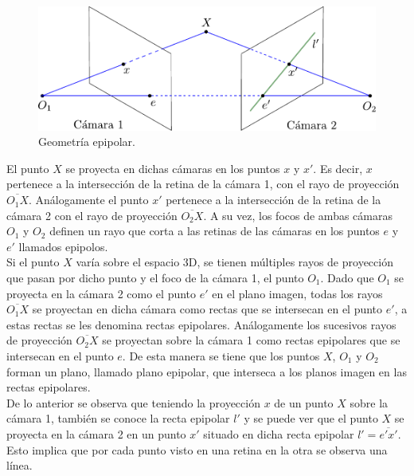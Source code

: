  \begin{figure}[ht!]
 \begin{center}
 \includegraphics[scale=0.7]{img/Reconstruccion/geometria_epipolar}
 \end{center}
 \caption{Geometría epipolar.}
 \label{fig: geometria_epipolar.}
 \end{figure}
 
  El punto $X$ se proyecta en dichas cámaras en los puntos $x$ y $x'$. Es decir, $x$ pertenece a la intersección de la retina de la cámara 1, con el rayo de proyección $\overline{O_1X}$. Análogamente el punto $x'$ pertenece a la intersección de la retina de la cámara 2 con el rayo de proyección $\overline{O_2X}$. A su vez, los focos de ambas cámaras $O_1$ y $O_2$ definen un rayo que corta a las retinas de las cámaras en los puntos $e$ y $e'$ llamados epipolos.\\
  
  Si el punto $X$ varía sobre el espacio 3D, se tienen múltiples rayos de proyección que pasan por dicho punto y el foco de la cámara 1, el punto $O_1$. Dado que $O_1$ se proyecta en la cámara 2 como el punto $e'$ en el plano imagen, todas los rayos  $\overline{O_1X}$ se proyectan en dicha cámara como rectas que se intersecan en el punto $e'$, a estas rectas se les denomina rectas epipolares. Análogamente los sucesivos rayos de proyección $\overline{O_2X}$ se proyectan sobre la cámara 1 como rectas epipolares que se intersecan en el punto $e$. De esta manera se tiene que los puntos $X$, $O_1$ y $O_2$ forman un plano, llamado plano epipolar,  que interseca a los planos imagen en las rectas epipolares.\\
  
De lo anterior se observa que teniendo la proyección $x$ de un punto $X$ sobre la cámara 1, también se conoce la recta epipolar $l'$ y se puede ver que el punto $X$ se proyecta en la cámara 2 en un punto $x'$ situado en dicha recta epipolar $l'=\overline{e'x'}$. Esto implica que por cada punto visto en una retina en la otra se observa una línea.\\
 
